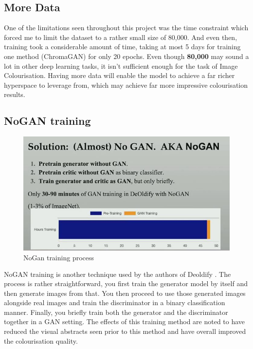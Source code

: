 \subsection{More Data}
One of the limitations seen throughout this project was the time constraint which forced me to limit the dataset to a rather small size of 80,000. And even then, training took a considerable amount of time, taking at most 5 days for training one method (ChromaGAN) for only 20 epochs. Even though \textbf{80,000} may sound a lot in other deep learning tasks, it isn't sufficient enough for the task of Image Colourisation. Having more data will enable the model to achieve a far richer hyperspace to leverage from, which may achieve far more impressive colourisation results.

\subsection{NoGAN training}

\begin{figure}[H]
    \centering
    \includegraphics[width=0.8\columnwidth]{sections/figures/nogan.JPG}
    \caption{NoGan training process \cite{nogan2020}}
    \label{fig:my_label}
\end{figure}

NoGAN training is another technique used by the authors of Deoldify \cite{nogan2020}. The process is rather straightforward, you first train the generator model by itself and then generate images from that. You then proceed to use those generated images alongside real images and train the discriminator in a binary classification manner. Finally, you briefly train both the generator and the discriminator together in a GAN setting. The effects of this training method are noted to have reduced the visual abstracts seen prior to this method and have overall improved the colourisation quality. 

